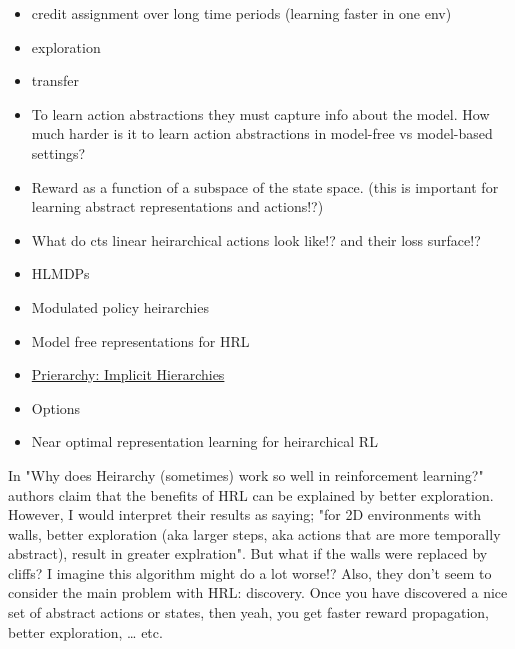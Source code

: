 \begin{itemize}
\item
  credit assignment over long time periods (learning faster in one env)
\item
  exploration
\item
  transfer
\item
  To learn action abstractions they must capture info about the model.
  How much harder is it to learn action abstractions in model-free vs
  model-based settings?
\item
  Reward as a function of a subspace of the state space. (this is
  important for learning abstract representations and actions!?)
\item
  What do cts linear heirarchical actions look like!? and their loss
  surface!?
\item
  HLMDPs \cite{Saxea}
\item
  Modulated policy heirarchies \cite{Pashevich}
\item
  Model free representations for HRL \cite{Rafati}
\item
  \href{https://blog.aqnichol.com/2019/04/03/prierarchy-implicit-hierarchies/}{Prierarchy:
  Implicit Hierarchies}
\item
  Options
\item
  Near optimal representation learning for heirarchical RL \cite{Nachum2018}
\end{itemize}

In "Why does Heirarchy (sometimes) work so well in reinforcement learning?" \cite{Dadashi2018}
authors claim that the benefits of HRL can be explained by better
exploration. However, I would interpret their results as saying; "for
2D environments with walls, better exploration (aka larger steps, aka actions that are more temporally abstract), result in greater
explration". But what if the walls were replaced by cliffs? I imagine
this algorithm might do a lot worse!? Also, they don't seem to consider the main problem with HRL: discovery.
Once you have discovered a nice set of abstract actions or states, then yeah,
you get faster reward propagation, better exploration, \ldots{} etc.
